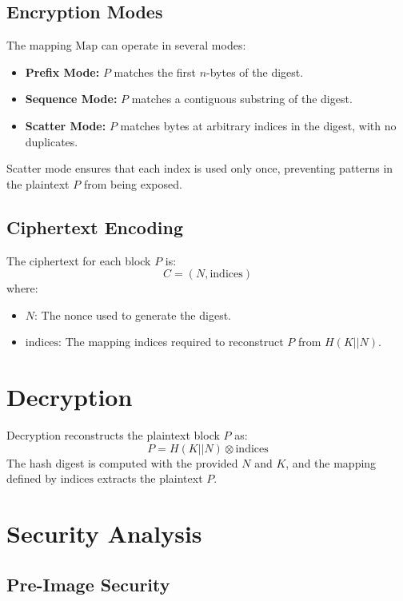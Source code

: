 \documentclass[11pt,a4paper]{article}
\begin{document}
\subsection*{Encryption Modes}

The mapping \( \text{Map} \) can operate in several modes:
\begin{itemize}
  \item \textbf{Prefix Mode:} \( P \) matches the first \( n \)-bytes of the digest.
  \item \textbf{Sequence Mode:} \( P \) matches a contiguous substring of the digest.
  \item \textbf{Scatter Mode:} \( P \) matches bytes at arbitrary indices in the digest, with no duplicates.
\end{itemize}

Scatter mode ensures that each index is used only once, preventing patterns in the plaintext \( P \) from being exposed.

\subsection*{Ciphertext Encoding}

The ciphertext for each block \( P \) is:
\[
C = (N, \text{indices})
\]
where:
\begin{itemize}
  \item \( N \): The nonce used to generate the digest.
  \item \( \text{indices} \): The mapping indices required to reconstruct \( P \) from \( H(K || N) \).
\end{itemize}

\section*{Decryption}

Decryption reconstructs the plaintext block \( P \) as:
\[
P = H(K || N) \otimes \text{indices}
\]
The hash digest is computed with the provided \( N \) and \( K \), and the mapping defined by \( \text{indices} \) extracts the plaintext \( P \).

\section*{Security Analysis}

\subsection*{Pre-Image Security}
\end{document}
